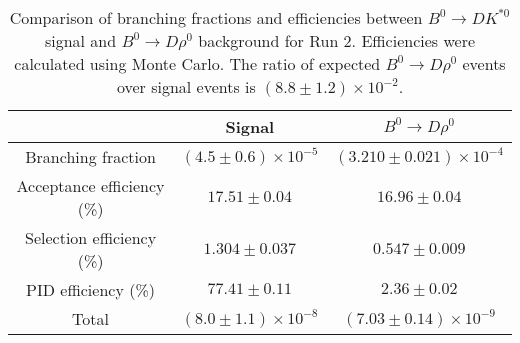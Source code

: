 \begin{table}
    \centering
    \begin{tabular}{ccc}
        \toprule
        & Signal & $B^0 \to D\rho^0$ \\
        \midrule
        Branching fraction & $(4.5 \pm 0.6) \times 10^{-5}$ & $(3.210 \pm 0.021) \times 10^{-4}$ \\
        Acceptance efficiency (\%) & $17.51 \pm 0.04$ & $16.96 \pm 0.04$ \\
        Selection efficiency (\%) & $1.304 \pm 0.037$ & $0.547 \pm 0.009$ \\
        PID efficiency (\%) & $77.41 \pm 0.11$ & $2.36 \pm 0.02$ \\
        \midrule
        Total & $(8.0 \pm 1.1) \times 10^{-8}$ & $(7.03 \pm 0.14) \times 10^{-9}$ \\
        \bottomrule
        \end{tabular}
        \caption{Comparison of branching fractions and efficiencies between $B^0 \to DK^{*0}$ signal and $B^0 \to D\rho^0$ background for Run 2. Efficiencies were calculated using Monte Carlo. The ratio of expected $B^0 \to D\rho^0$ events over signal events is $(8.8 \pm 1.2) \times 10^{-2}$.}
\label{tab:rho_efficiency_run2}
\end{table}

